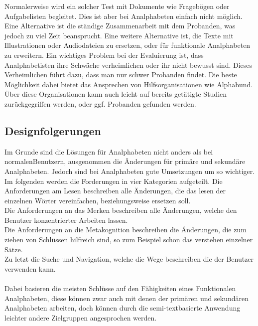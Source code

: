 Normalerweise wird ein solcher Test mit Dokumente wie Fragebögen oder Aufgabelisten begleitet. 
Dies ist aber bei Analphabeten einfach nicht möglich.
Eine Alternative ist die ständige Zusammenarbeit mit dem Probanden, was jedoch zu viel Zeit beansprucht. Eine weitere Alternative ist, die Texte mit Illustrationen oder Audiodateien zu ersetzen, oder für funktionale Analphabeten zu erweitern. Ein wichtiges Problem bei der Evaluierung ist, dass Analphabetisten ihre Schwäche verheimlichen oder ihr nicht bewusst sind. Dieses Verheimlichen führt dazu, dass man nur schwer Probanden findet. Die beste Möglichkeit dabei bietet das Ansprechen von Hilfsorganisationen wie \glqq Alphabund\grqq. Über diese Organisationen kann auch leicht auf bereits getätigte Studien zurückgegriffen werden, oder ggf. Probanden gefunden werden.

\subsection{ Designfolgerungen }
Im Grunde sind die Lösungen für Analphabeten nicht anders als bei \glqq normalen\grqq Benutzern, ausgenommen die Änderungen für primäre und sekundäre Analphabeten. Jedoch sind bei Analphabeten gute Umsetzungen um so wichtiger.\\
Im folgenden werden die Forderungen in vier Kategorien aufgeteilt. 
Die Anforderungen am Lesen beschreiben alle Änderungen, die das lesen der einzelnen Wörter vereinfachen, beziehungsweise ersetzen soll.\\
Die Anforderungen an das Merken beschreiben alle Änderungen, welche den Benutzer konzentrierter Arbeiten lassen.\\
Die Anforderungen an die Metakognition beschreiben die Änderungen, die zum ziehen von Schlüssen hilfreich sind, so zum Beispiel schon das verstehen einzelner Sätze.\\
Zu letzt die Suche und Navigation, welche die Wege beschreiben die der Benutzer verwenden kann.\\\\
Dabei basieren die meisten Schlüsse auf den Fähigkeiten eines Funktionalen Analphabeten, diese können zwar auch mit denen der primären und sekundären Analphabeten arbeiten, doch können durch die semi-textbasierte Anwendung leichter andere Zielgruppen angesprochen werden.

